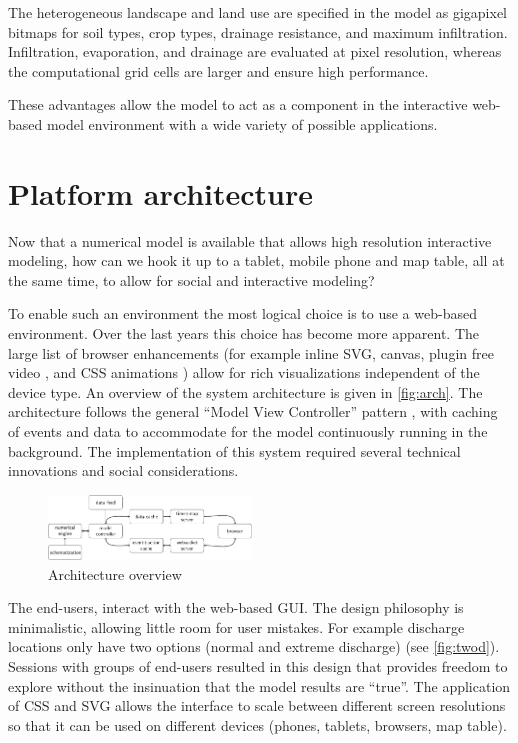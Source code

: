 \documentclass[a4paper]{article}
\begin{document}
The heterogeneous landscape and land use are specified in the model as gigapixel bitmaps for soil types, crop types, drainage resistance, and maximum infiltration. Infiltration, evaporation, and drainage are evaluated at pixel resolution, whereas the computational grid cells are larger and ensure high performance.

These advantages allow the model to act as a component in the interactive web-based model environment with a wide variety of possible applications.


\section{Platform architecture}
Now that a numerical model is available that allows high resolution interactive modeling, how can we hook it up to a tablet, mobile phone and map table, all at the same time, to allow for social and interactive modeling?

To enable such an environment the most logical choice is to use a web-based environment. Over the last years this choice has become more apparent. The large list of browser enhancements (for example inline \ac{SVG}, canvas, plugin free video \citep{Berjon2014}, and \ac{CSS} animations \citep{Jackson2013}) allow for rich visualizations independent of the device type. An overview of the system architecture is given in \autoref{fig:arch}. The architecture follows the general ``Model View Controller'' pattern \citep{Gamma1994}, with caching of events and data to accommodate for the model continuously running in the background. The implementation of this system required several technical innovations and social considerations.

\begin{figure}
  \centering
  \vspace{-20pt}
  \includegraphics[width=0.48\textwidth]{arch}
  \caption{Architecture overview}
  \label{fig:arch}
\end{figure}

The end-users, interact with the web-based \ac{GUI}. The design philosophy is minimalistic, allowing little room for user mistakes. For example discharge locations only have two options (normal and extreme discharge) (see \autoref{fig:twod}). Sessions with groups of end-users resulted in this design that provides freedom to explore without the insinuation that the model results are ``true''. The application of \ac{CSS} and \ac{SVG} allows the interface to scale between different screen resolutions so that it can be used on different devices (phones, tablets, browsers, map table).
\end{document}
